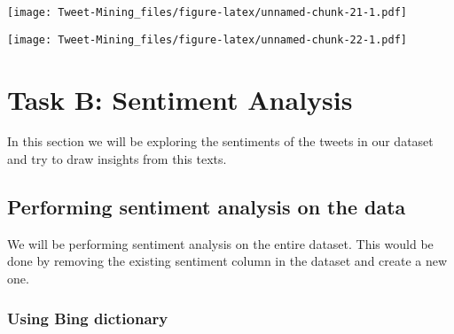 \documentclass[
]{article}
\newenvironment{Shaded}{\begin{snugshade}}{\end{snugshade}}
\newcommand{\CommentTok}[1]{\textcolor[rgb]{0.56,0.35,0.01}{\textit{#1}}}
\newcommand{\DataTypeTok}[1]{\textcolor[rgb]{0.13,0.29,0.53}{#1}}
\newcommand{\DecValTok}[1]{\textcolor[rgb]{0.00,0.00,0.81}{#1}}
\newcommand{\FloatTok}[1]{\textcolor[rgb]{0.00,0.00,0.81}{#1}}
\newcommand{\KeywordTok}[1]{\textcolor[rgb]{0.13,0.29,0.53}{\textbf{#1}}}
\newcommand{\NormalTok}[1]{#1}
\newcommand{\OperatorTok}[1]{\textcolor[rgb]{0.81,0.36,0.00}{\textbf{#1}}}
\newcommand{\OtherTok}[1]{\textcolor[rgb]{0.56,0.35,0.01}{#1}}
\newcommand{\StringTok}[1]{\textcolor[rgb]{0.31,0.60,0.02}{#1}}
\begin{document}
\texttt{[image: Tweet-Mining\_files/figure-latex/unnamed-chunk-21-1.pdf]}

\begin{Shaded}
\end{Shaded}

\texttt{[image: Tweet-Mining\_files/figure-latex/unnamed-chunk-22-1.pdf]}

\hypertarget{task-b-sentiment-analysis}{%
\section{Task B: Sentiment Analysis}\label{task-b-sentiment-analysis}}

In this section we will be exploring the sentiments of the tweets in our
dataset and try to draw insights from this texts.

\hypertarget{performing-sentiment-analysis-on-the-data}{%
\subsection{Performing sentiment analysis on the
data}\label{performing-sentiment-analysis-on-the-data}}

We will be performing sentiment analysis on the entire dataset. This
would be done by removing the existing sentiment column in the dataset
and create a new one.

\hypertarget{using-bing-dictionary}{%
\subsubsection{Using Bing dictionary}\label{using-bing-dictionary}}
\end{document}
